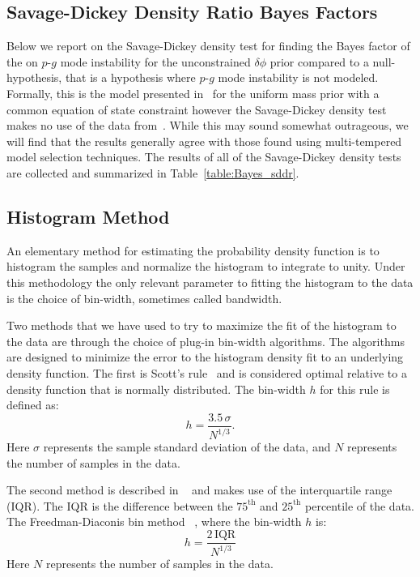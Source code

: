\subsection{Savage-Dickey Density Ratio Bayes Factors}\label{sec:prob_density_estimator_performance}
Below we report on the Savage-Dickey density test for finding the Bayes factor of the  on $p$-$g$ mode instability for the unconstrained $\delta \phi$ prior compared to a null-hypothesis, that is a hypothesis where $p$-$g$ mode instability is not modeled. Formally, this is the model presented in~\cite{de2018tidal} for the uniform mass prior with a common equation of state constraint however the Savage-Dickey density test makes no use of the data from~\cite{de2018tidal}. While this may sound somewhat outrageous, we will find that the results generally agree with those found using multi-tempered model selection techniques. The results of all of the Savage-Dickey density tests are collected and summarized in Table~\ref{table:Bayes_sddr}.

\subsection{Histogram Method}
An elementary method for estimating the probability density function is to histogram the samples and normalize the histogram to integrate to unity. Under this methodology the only relevant parameter to fitting the histogram to the data is the choice of bin-width, sometimes called bandwidth.

Two methods that we have used to try to maximize the fit of the histogram to the data are through the choice of plug-in bin-width algorithms. The algorithms are designed to minimize the error to the histogram density fit to an underlying density function. The first is Scott's rule~\citep{scott1979optimal} and is considered optimal relative to a density function that is normally distributed. The bin-width $h$ for this rule is defined as:
\begin{equation}
    h = \frac{3.5 \, \sigma}{N^{1/3}}.
\end{equation}
Here $\sigma$ represents the sample standard deviation of the data, and $N$ represents the number of samples in the data.

The second method is described in ~\cite{Freedman1981} and makes use of the interquartile range (IQR). The IQR is the difference between the $75^{\mathrm{th}}$ and $25^{\mathrm{th}}$ percentile of the data. The Freedman-Diaconis bin method ~\citep{Freedman1981}, where the bin-width $h$ is:
\begin{equation}
    h = \frac{2 \, \mathrm{IQR}}{N^{1/3}}
\end{equation}
Here $N$ represents the number of samples in the data.

